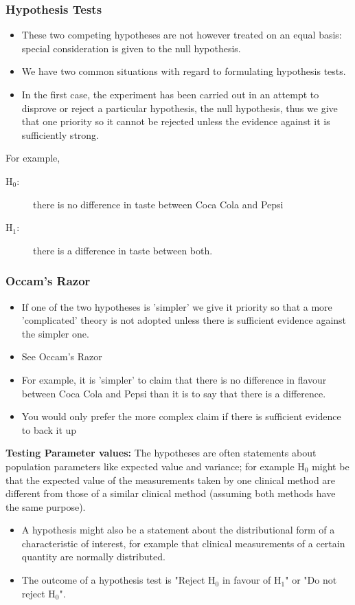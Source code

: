 \documentclass{beamer}
\begin{document}
\begin{frame}
\frametitle{Hypothesis Tests}
\begin{itemize}
\item These two competing hypotheses are not however treated on an
	equal basis: special consideration is given to the null hypothesis.
\item We have two common situations with regard to formulating hypothesis tests.
\item In the first case, the experiment has been carried out in an attempt to
	disprove or reject a particular hypothesis, the null hypothesis,
	thus we give that one priority so it cannot be rejected unless
	the evidence against it is sufficiently strong.
\end{itemize}
\end{frame}
\begin{frame}
	For example,
\begin{description}
\item[H$_0$:] there is no difference in taste between Coca Cola and Pepsi
\item[H$_1$:] there is a difference in taste between both.
\end{description}
\end{frame}
\begin{frame}
\frametitle{Occam's Razor}
\begin{itemize}
	\item If one of the two hypotheses is 'simpler' we give it priority so
	that a more 'complicated' theory is not adopted unless there
	is sufficient evidence against the simpler one.
	\item See Occam's Razor
	\item For example, it is 'simpler' to claim that there is no difference
	in flavour between Coca Cola and Pepsi than it is to say that
	there is a difference.
	\item You would only prefer the more complex claim if there is sufficient evidence to back it up
\end{itemize}

\end{frame}
\begin{frame}
\noindent \textbf{Testing Parameter values:}
	The hypotheses are often statements about population parameters
	like expected value and variance; for example H$_0$ might be that the
	expected value of the measurements taken by one clinical method
	are different from those of a similar clinical method (assuming both
	methods have the same purpose).
\begin{itemize}
	\item 	A hypothesis might also be a statement about the distributional
	form of a characteristic of interest, for example that clinical
	measurements of a certain quantity are normally distributed.
\item The outcome of a hypothesis test is "Reject H$_0$ in favour of H$_1$" or
	"Do not reject H$_0$".
\end{itemize}

\end{frame}
\end{document}
